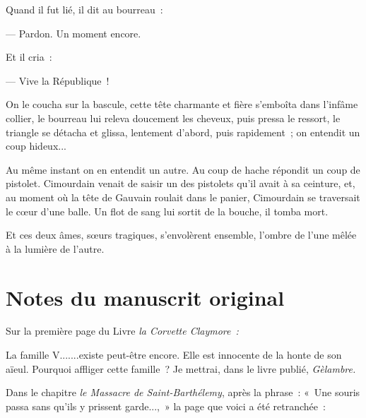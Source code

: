 \documentclass[french,twoside]{book} %
\def\mednobreak{\ifdim\lastskip<\medskipamount
  \removelastskip\nopagebreak\medskip\fi}
\newcommand{\labelblock}[1]{\medbreak{\noindent\color{rubric}\bfseries #1}\par\mednobreak}
\begin{document}
Quand il fut lié, il dit au bourreau :\par
— Pardon. Un moment encore.\par
Et il cria :\par
— Vive la République !\par
On le coucha sur la bascule, cette tête charmante et fière s’emboîta dans l’infâme collier, le bourreau lui releva doucement les cheveux, puis pressa le ressort, le triangle se détacha et glissa, lentement d’abord, puis rapidement ; on entendit un coup hideux...\par
 Au même instant on en entendit un autre. Au coup de hache répondit un coup de pistolet. Cimourdain venait de saisir un des pistolets qu’il avait à sa ceinture, et, au moment où la tête de Gauvain roulait dans le panier, Cimourdain se traversait le cœur d’une balle. Un flot de sang lui sortit de la bouche, il tomba mort.\par
Et ces deux âmes, sœurs tragiques, s’envolèrent ensemble, l’ombre de l’une mêlée à la lumière de l’autre.
 \section[{Notes du manuscrit original}]{Notes du manuscrit original}
\label{notes}\renewcommand{\leftmark}{Notes du manuscrit original}


\labelblock{Note I}

\noindent Sur la première page du Livre \emph{la Corvette Claymore :}\par
\bigbreak
\noindent La famille V.......existe peut-être encore. Elle est innocente de la honte de son aïeul. Pourquoi affliger cette famille ? Je mettrai, dans le livre publié, \emph{Gèlambre.}\par

\labelblock{Note II}

\noindent Dans le chapitre \emph{le Massacre de Saint-Barthélemy}, après la phrase : « Une souris passa sans qu’ils y prissent garde..., » la page que voici a été retranchée :\par
\end{document}
